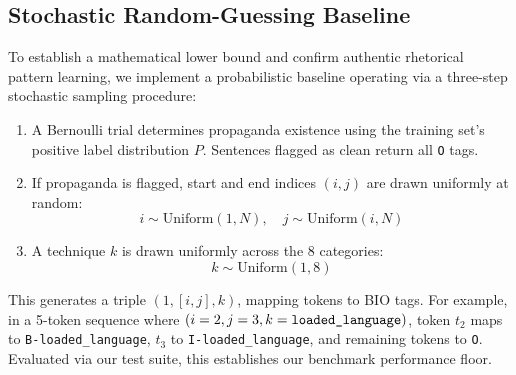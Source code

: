 \documentclass[12pt, a4paper]{article}
\begin{document}
\subsection{Stochastic Random-Guessing Baseline}
\label{subsec:task2_baseline}

To establish a mathematical lower bound and confirm authentic rhetorical pattern learning, we implement a probabilistic baseline operating via a three-step stochastic sampling procedure:
\begin{enumerate}[leftmargin=*, noitemsep]
    \item A Bernoulli trial determines propaganda existence using the training set's positive label distribution $P$. Sentences flagged as clean return all \texttt{O} tags.
    \item If propaganda is flagged, start and end indices $(i, j)$ are drawn uniformly at random:
    \[
    i \sim \text{Uniform}(1, N), \quad j \sim \text{Uniform}(i, N)
    \]
    \item A technique $k$ is drawn uniformly across the 8 categories:
    \[
    k \sim \text{Uniform}(1, 8)
    \]
\end{enumerate}

This generates a triple $(1, [i, j], k)$, mapping tokens to BIO tags. For example, in a 5-token sequence where $(i=2, j=3, k=\text{\texttt{loaded\_language}})$, token $t_2$ maps to \texttt{B-loaded\_language}, $t_3$ to \texttt{I-loaded\_language}, and remaining tokens to \texttt{O}. Evaluated via our test suite, this establishes our benchmark performance floor.
\end{document}
